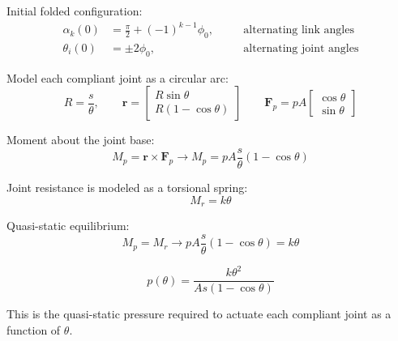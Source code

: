 \documentclass[11pt]{article}
\begin{document}
Initial folded configuration:
\[
\begin{aligned}
\alpha_k(0) &= \frac{\pi}{2} + (-1)^{k-1}\phi_0,
&\quad & \text{alternating link angles} \\[6pt]
\theta_i(0) &= \pm 2\phi_0,
&\quad & \text{alternating joint angles}
\end{aligned}
\]

Model each compliant joint as a circular arc:
\[
R = \frac{s}{\theta},
\qquad
\mathbf{r} =
\begin{bmatrix}
R \sin\theta \\
R(1-\cos\theta)
\end{bmatrix}
\qquad
\mathbf{F}_p = pA
\begin{bmatrix}
\cos\theta \\
\sin\theta
\end{bmatrix}
\]


Moment about the joint base:
\[
M_p = \mathbf{r} \times \mathbf{F}_p \to \boxed{M_p = p A \frac{s}{\theta} (1 - \cos\theta)
}
\]

Joint resistance is modeled as a torsional spring:
\[
\boxed{
M_r = k \theta
}
\]

Quasi-static equilibrium:
\[
M_p = M_r \to p A \frac{s}{\theta}(1 - \cos\theta) = k \theta
\]

\[
\boxed{
p(\theta) =
\frac{k \theta^2}{A s (1 - \cos\theta)}
}
\]

This is the quasi-static pressure required to actuate each compliant joint 
as a function of $\theta$.
\end{document}
